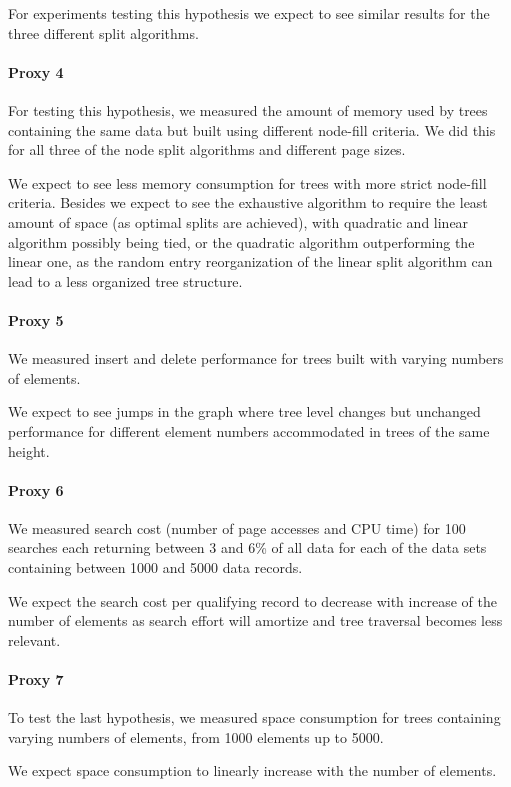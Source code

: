 For experiments testing this hypothesis we expect to see similar results for the three different split algorithms. 

\paragraph{Proxy 4}
For testing this hypothesis, we measured the amount of memory used by trees containing the same data but built using different node-fill criteria. We did this for all three of the node split algorithms and different page sizes.

We expect to see less memory consumption for trees with more strict node-fill criteria. Besides we expect to see the exhaustive algorithm to require the least amount of space (as optimal splits are achieved), with quadratic and linear algorithm possibly being tied, or the quadratic algorithm outperforming the linear one, as the random entry reorganization of the linear split algorithm can lead to a less organized tree structure. 

\paragraph{Proxy 5}
We measured insert and delete performance for trees built with varying numbers of elements. 

We expect to see jumps in the graph where tree level changes but unchanged performance for different element numbers accommodated in trees of the same height.

\paragraph{Proxy 6}
We measured search cost (number of page accesses and CPU time) for 100 searches each returning between 3 and 6\% of all data for each of the data sets containing between 1000 and 5000 data records.

We expect the search cost per qualifying record to decrease with increase of the number of elements as search effort will amortize and tree traversal becomes less relevant.

\paragraph{Proxy 7}
To test the last hypothesis, we measured space consumption for trees containing varying numbers of elements, from 1000 elements up to 5000.

We expect space consumption to linearly increase with the number of elements.

